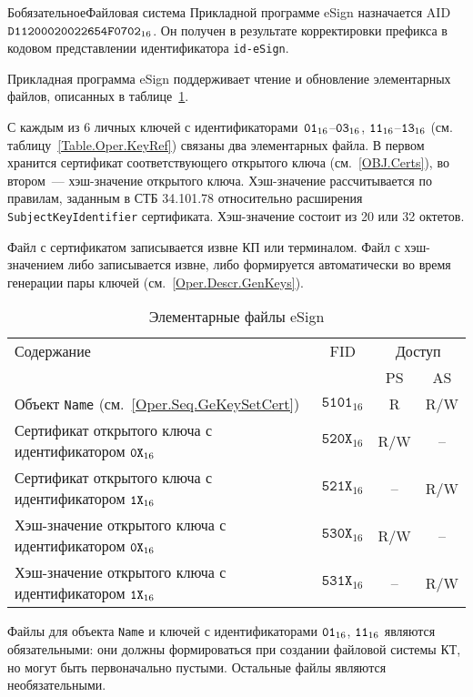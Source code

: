 \begin{appendix}{Б}{обязательное}{Файловая система}
Прикладной программе eSign назначается AID~$\texttt{D11200020022654F0702}_{16}$. 
Он получен в результате корректировки префикса в кодовом представлении 
идентификатора \verb|id-eSign|.

Прикладная программа eSign поддерживает чтение и обновление 
элементарных файлов, описанных в таблице~\ref{Table.FILES.EFSIGN}.

С каждым из 6 личных ключей с идентификаторами~$\texttt{01}_{16}$--$\texttt{03}_{16}$,
$\texttt{11}_{16}$--$\texttt{13}_{16}$ (см. таблицу~\ref{Table.Oper.KeyRef}) 
связаны два элементарных файла. 
В первом хранится сертификат соответствующего открытого ключа 
(см.~\ref{OBJ.Certs}), во втором~--- хэш-значение открытого ключа.
%
Хэш-значение рассчитывается по правилам, заданным в СТБ 34.101.78
относительно расширения \texttt{SubjectKeyIdentifier} сертификата.
%
Хэш-значение состоит из 20 или 32 октетов.

Файл с сертификатом записывается извне КП или терминалом.
Файл с хэш-значением либо записывается извне, либо формируется 
автоматически во время генерации пары ключей 
(см.~\ref{Oper.Descr.GenKeys}).

\begin{table}[H]
\caption{Элементарные файлы eSign}
\label{Table.FILES.EFSIGN}
\begin{tabular}{|l|c|c|c|}
\hline
Содержание & FID & \multicolumn{2}{|c|}{Доступ}\\
\cline{3-4}
&& PS & AS \\
\hline
\hline
Объект \texttt{Name} (см.~\ref{Oper.Seq.GeKeySetCert}) & 
$\texttt{5101}_{16}$ & R & R/W \\
Сертификат открытого ключа с идентификатором $\texttt{0X}_{16}$ & 
$\texttt{520X}_{16}$ & R/W & -- \\
Сертификат открытого ключа с идентификатором $\texttt{1X}_{16}$ & 
$\texttt{521X}_{16}$ & -- & R/W \\
Хэш-значение открытого ключа с идентификатором $\texttt{0X}_{16}$ & 
$\texttt{530X}_{16}$ & R/W & -- \\
Хэш-значение открытого ключа с идентификатором $\texttt{1X}_{16}$ & 
$\texttt{531X}_{16}$ & -- & R/W \\
\hline
\end{tabular}
\end{table}

Файлы для объекта \texttt{Name} и ключей с идентификаторами $\texttt{01}_{16}$, $\texttt{11}_{16}$
являются обязательными: они должны формироваться при создании файловой 
системы КТ, но могут быть первоначально пустыми. Остальные файлы являются 
необязательными.

\end{appendix}